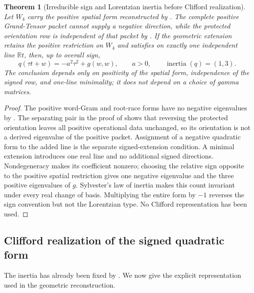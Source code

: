 \documentclass[11pt]{article}
\newtheorem{theorem}{Theorem}[section]
\numberwithin{equation}{section}
\theoremstyle{definition}
\theoremstyle{remark}
\newcommand{\R}{\mathbb R}
\begin{document}
\begin{theorem}[Irreducible sign and Lorentzian inertia before Clifford realization]
\label{thm:supp-signature-minimality}
Let $W_4$ carry the positive spatial form reconstructed by
.  The complete positive Grand-Tensor packet cannot
supply a negative direction, while the protected orientation row is independent
of that packet by .  If the geometric
extension retains the positive restriction on $W_4$ and satisfies
 on exactly one independent line $\R t$,
then, up to overall sign,
\begin{equation}
 q(\tau t+w)=-a^2\tau^2+g(w,w),\qquad a>0,
 \qquad \operatorname{inertia}(q)=(1,3).
 \label{eq:supp-signature-inertia}
\end{equation}
The conclusion depends only on positivity of the spatial form, independence of
the signed row, and one-line minimality; it does not depend on a choice of gamma
matrices.
\end{theorem}
\begin{proof}
The positive word-Gram and root-race forms have no negative eigenvalues by
.  The separating pair in the proof of
 shows that reversing the protected
orientation leaves all positive operational data unchanged, so its orientation is not
a derived eigenvalue of the positive packet. Assignment of a negative
quadratic form to the added line is the separate signed-extension condition.  A minimal extension introduces
one real line and no additional signed directions.  Nondegeneracy makes its
coefficient nonzero; choosing the relative sign opposite to the positive
spatial restriction gives one negative eigenvalue and the three positive
eigenvalues of $g$.  Sylvester's law of inertia makes this count invariant
under every real change of basis.  Multiplying the entire form by $-1$ reverses
the sign convention but not the Lorentzian type.  No Clifford representation
has been used.
\end{proof}

\subsection{Clifford realization of the signed quadratic form}

The inertia has already been fixed by
. We now give the explicit representation
used in the geometric reconstruction.
\end{document}
